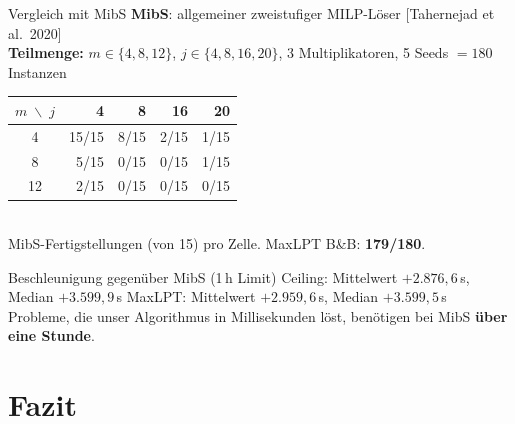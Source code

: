 \documentclass[fleqn,11pt,aspectratio=43]{beamer}
\begin{document}
\begin{frame}[shrink=12]{Vergleich mit MibS}
  \textbf{MibS}: allgemeiner zweistufiger MILP-Löser [Tahernejad et al.\ 2020]\\
  \textbf{Teilmenge:} $m\in\{4,8,12\}$, $j\in\{4,8,16,20\}$, 3 Multiplikatoren, 5 Seeds $=180$ Instanzen

  \begin{center}\small
  \begin{tabular}{crrrr}
    \toprule
    $m\;\backslash\; j$ & 4 & 8 & 16 & 20\\
    \midrule
    4  & 15/15 & 8/15 & 2/15 & 1/15\\
    8  & 5/15  & 0/15 & 0/15 & 1/15\\
    12 & 2/15  & 0/15 & 0/15 & 0/15\\
    \bottomrule
  \end{tabular}\\[0.2em]
  {\footnotesize MibS-Fertigstellungen (von 15) pro Zelle. MaxLPT B\&B: \textbf{179/180}.}
  \end{center}

  \begin{alertblock}{Beschleunigung gegenüber MibS (1\,h Limit)}
    \small Ceiling: Mittelwert $+2{.}876{,}6$\,s, Median $+3{.}599{,}9$\,s\quad
    MaxLPT: Mittelwert $+2{.}959{,}6$\,s, Median $+3{.}599{,}5$\,s\\
    Probleme, die unser Algorithmus in Millisekunden löst, benötigen bei MibS \textbf{über eine Stunde}.
  \end{alertblock}
\end{frame}

\section{Fazit}
\end{document}
